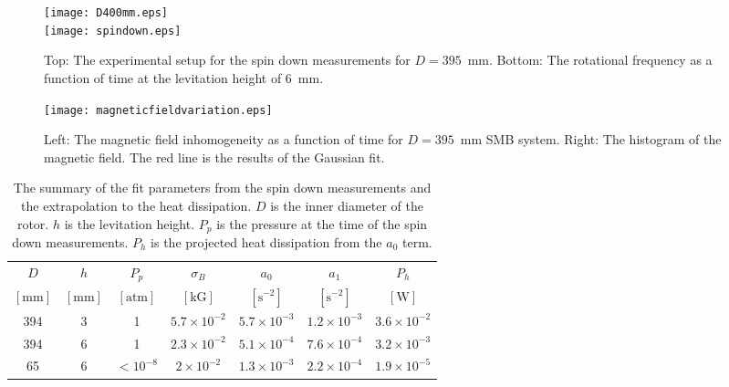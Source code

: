 \documentclass[journal]{IEEEtran}
\begin{document}
\begin{figure}[htb]
   \centering
   \texttt{[image: D400mm.eps]} \\
   \vspace{3mm}
   \texttt{[image: spindown.eps]}
   \caption{Top: The experimental setup for the spin down measurements for $D=395$~mm. Bottom: The rotational frequency as a function of time at the levitation height of 6~mm.}
   \label{fig:spindown}
\end{figure}

\begin{figure}[htb]
   \centering
   \texttt{[image: magneticfieldvariation.eps]} %
   \caption{Left: The magnetic field inhomogeneity as a function of time for $D=395$~mm SMB system. Right: The histogram of the magnetic field. The red line is the results of the Gaussian fit. }
   \label{fig:Bval}
\end{figure}


\begin{table*}[t]
   \centering
   \begin{tabular}{c|c|c|c|c|c|c} %
	    $D$ & $h$& $P_p$ & $\sigma_B$ &$a_0$ & $a_1$  & $P_h$\\
	     $[\mbox{mm}]$ & $[\mbox{mm}]$ & $[\mbox{atm}]$ & $[\mbox{kG}]$ & $[\mbox{s}^{-2}]$  & $[\mbox{s}^{-2}]$  & $[\mbox{W}]$ \\ \hline
        394 & 3  & 1  & $5.7\times10^{-2}$ & $5.7\times10^{-3}$  & $1.2\times10^{-3}$ & $3.6\times10^{-2}$\\
	394 & 6  &  1 & $2.3\times10^{-2}$ & $5.1\times10^{-4}$ & $7.6\times10^{-4}$ & $3.2\times10^{-3}$\\
	65 & 6   &  $<10^{-8}$ & $2\times10^{-2}$ & $1.3\times10^{-3}$ & $2.2\times10^{-4}$ & $1.9\times10^{-5}$
   \end{tabular}
   \caption{The summary of the fit parameters from the spin down measurements and the extrapolation to the heat dissipation.
     $D$ is the inner diameter of the rotor.
     $h$ is the levitation height.
     $P_p$ is the pressure at the time of the spin down measurements.
     $P_h$ is the projected heat dissipation from the $a_0$ term.}

   \label{tab:fitpar}
\end{table*}
\end{document}
